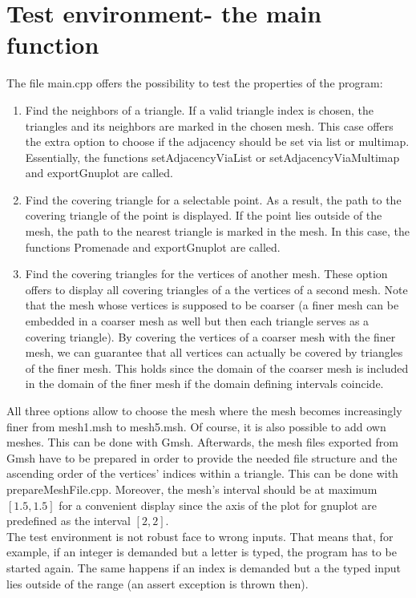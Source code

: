 \documentclass[10pt]{article}
\begin{document}
\section{Test environment- the main function}
	The file main.cpp offers the possibility to test the properties of the program:
	\begin{enumerate}
		\item 
		Find the neighbors of a triangle.
		If a valid triangle index is chosen, the triangles and its neighbors are marked in the chosen mesh. This case offers the extra option to choose if the adjacency should be set via list or multimap. Essentially, the functions 
		{\ttfamily setAdjacencyViaList} or {\ttfamily setAdjacencyViaMultimap} and {\ttfamily exportGnuplot} are called. 
		\item 
		Find the covering triangle for a selectable point. 
		As a result, the path to the covering triangle of the point is displayed. 
		If the point lies outside of the mesh, the path to the nearest triangle is marked in the mesh. 
		In this case, the functions {\ttfamily Promenade} and {\ttfamily exportGnuplot} are called.
		\item 
		Find the covering triangles for the vertices of another mesh. These option offers to display all covering triangles of a the vertices of a second mesh. Note that the mesh whose vertices is supposed to be coarser (a finer mesh can be embedded in a coarser mesh as well but then each triangle serves as a covering triangle). By covering the vertices of a coarser mesh with the finer mesh, we can guarantee that all vertices can actually be covered by triangles of the finer mesh. This holds since the domain of the coarser mesh is included in the domain of the finer mesh if the domain defining intervals coincide.
	\end{enumerate}
	All three options allow to choose the mesh where the mesh becomes increasingly finer from mesh1.msh to mesh5.msh. 
	Of course, it is also possible to add own meshes. This can be done with {\ttfamily Gmsh}. Afterwards, the mesh files exported from {\ttfamily Gmsh} have to be prepared in order to provide the needed file structure and the ascending order of the vertices' indices within a triangle. This can be done with prepareMeshFile.cpp. Moreover, the mesh's interval should be at maximum $ [1.5,1.5] $ for a convenient display since the axis of the plot for {\ttfamily gnuplot} are predefined as the interval $ [2,2] $. \\
	The test environment is not robust face to wrong inputs. That means that, for example, if an integer is demanded but a letter is typed, the program has to be started again. The same happens if an index is demanded but a the typed input lies outside of the range (an assert exception is thrown then).
	
\end{document}
